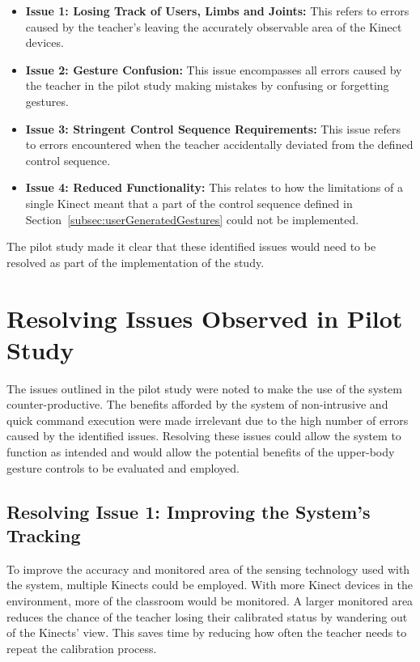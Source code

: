 \documentclass[link]{IWCOMP}
\begin{document}
\begin{itemize}
\item \textbf{Issue 1: Losing Track of Users, Limbs and Joints:}
This refers to errors caused by the teacher's leaving the accurately observable area of the Kinect devices.
\item \textbf{Issue 2: Gesture Confusion:}
This issue encompasses all errors caused by the teacher in the pilot study making mistakes by confusing or forgetting gestures.
\item \textbf{Issue 3: Stringent Control Sequence Requirements:}
This issue refers to errors encountered when the teacher accidentally deviated from the defined control sequence.
\item \textbf{Issue 4: Reduced Functionality:}
This relates to how the limitations of a single Kinect meant that a part of the control sequence defined in Section~\ref{subsec:userGeneratedGestures} could not be implemented.
\end{itemize}

The pilot study made it clear that these identified issues would need to be resolved as part of the implementation of the study.

\section{Resolving Issues Observed in Pilot Study}
\label{sec:resolvingIssuesObserved}

The issues outlined in the pilot study were noted to make the use of the system counter-productive.
The benefits afforded by the system of non-intrusive and quick command execution were made irrelevant due to the high number of errors caused by the identified issues.
Resolving these issues could allow the system to function as intended and would allow the potential benefits of the upper-body gesture controls to be evaluated and employed.

\subsection{Resolving Issue 1: Improving the System's Tracking}
\label{subsec:resolvingIssuesObserved1}

To improve the accuracy and monitored area of the sensing technology used with the system, multiple Kinects could be employed.
With more Kinect devices in the environment, more of the classroom would be monitored.
A larger monitored area reduces the chance of the teacher losing their calibrated status by wandering out of the Kinects' view.
This saves time by reducing how often the teacher needs to repeat the calibration process.
\end{document}

